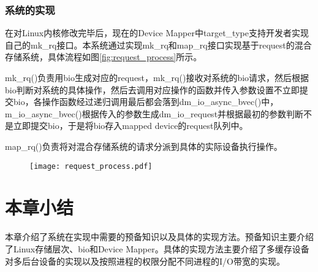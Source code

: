 \subsubsection{系统的实现}

在对Linux内核修改完毕后，现在的Device Mapper中target\_type支持开发者实现自己的mk\_rq接口。本系统通过实现mk\_rq和map\_rq接口实现基于request的混合存储系统，具体流程如图\ref{fig:request_process}所示。

mk\_rq()负责用bio生成对应的request，mk\_rq()接收对系统的bio请求，然后根据bio判断对系统的具体操作，然后去调用对应操作的函数并传入参数设置不立即提交bio，各操作函数经过递归调用最后都会落到dm\_io\_async\_bvec()中，m\_io\_async\_bvec()根据传入的参数生成dm\_io\_request并根据最初的参数判断不是立即提交bio，于是将bio存入mapped device的request队列中。

map\_rq()负责将对混合存储系统的请求分派到具体的实际设备执行操作。

\begin{figure}[!htp]
    \centering
    \texttt{[image: request\_process.pdf]}
\end{figure}


\section{本章小结}

本章介绍了系统在实现中需要的预备知识以及具体的实现方法。预备知识主要介绍了Linux存储层次、bio和Device Mapper。具体的实现方法主要介绍了多缓存设备对多后台设备的实现以及按照进程的权限分配不同进程的I/O带宽的实现。